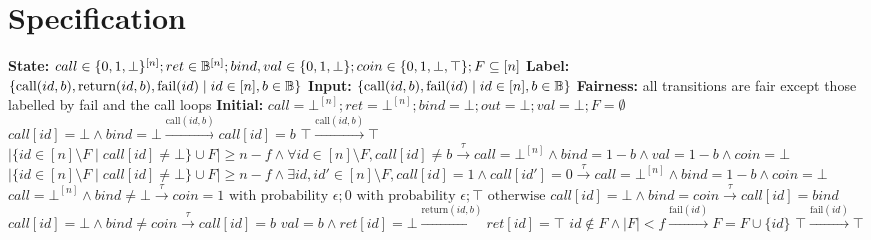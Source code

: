 \clearpage
\section{Specification}

\begin{transys}
    \label{PLTS:ABA}
    \caption{Encoding of \textsf{ABA}}
    \begin{algorithmic}
        \State \textbf{State:} $call \in \{0,1,\bot\}^{[n]}; ret \in \mathbb{B}^{[n]};
        bind, val \in \{0,1,\bot\}; coin \in \{0,1,\bot,\top\}; F \subseteq [n]$
        \State \textbf{Label:} $\{\text{call}(id,b), \text{return}(id,b), \text{fail}(id) \mid
        id \in [n], b \in \mathbb{B}\}$
        \State \textbf{Input:} $\{\text{call}(id,b), \text{fail}(id) \mid id \in [n], b \in \mathbb{B}\}$
        \State \textbf{Fairness:} all transitions are fair except those labelled by fail and the
        call loops
        \State \textbf{Initial:} $call = \bot^{[n]}; ret = \bot^{[n]}; bind = \bot; out = \bot;
        val = \bot; F = \emptyset$
        \medskip
        \State
        $call[id] = \bot \wedge bind = \bot
        \xrightarrow{\text{call}(id,b)}
        call[id] = b$
        \State
        $\top
        \xrightarrow{\text{call}(id,b)}
        \top$ 
        \State
        $|\{id \in [n] \setminus F \mid call[id] \ne \bot\} \cup F| \ge n-f
        \wedge \forall id \in [n] \setminus F, call[id] \ne b
        \xrightarrow{\tau}
        call = \bot^{[n]} \wedge bind = 1-b \wedge val = 1-b \wedge coin = \bot$
        \State
        $|\{id \in [n] \setminus F \mid call[id] \ne \bot\} \cup F| \ge n-f
        \wedge \exists id, id' \in [n] \setminus F, call[id] = 1 \wedge call[id'] = 0
        \xrightarrow{\tau}
        call = \bot^{[n]} \wedge bind = 1-b \wedge coin = \bot$
        \State
        $call = \bot^{[n]} \wedge bind \ne \bot
        \xrightarrow{\tau}
        coin = 1 \text{ with probability } \epsilon; 0 \text{ with probability } \epsilon;
        \top \text{ otherwise}$
        \State
        $call[id] = \bot \wedge bind = coin
        \xrightarrow{\tau}
        call[id] = bind$
        \State
        $call[id] = \bot \wedge bind \ne coin
        \xrightarrow{\tau}
        call[id] = b$ 
        \State
        $val = b \wedge ret[id] = \bot
        \xrightarrow{\text{return}(id,b)}
        ret[id] = \top$
        \State
        $id \not\in F \wedge |F| < f
        \xrightarrow{\text{fail}(id)}
        F = F \cup \{id\}$
        \State
        $\top
        \xrightarrow{\text{fail}(id)}
        \top$ 
    \end{algorithmic}
\end{transys}

